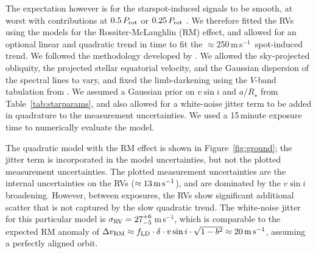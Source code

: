 \documentclass[12pt,modern,twocolumn,tighten]{aastex63}
\newcommand{\ms}{\,m\,s$^{-1}$}
\begin{document}
The expectation however is for the starspot-induced signals to be
smooth, at worst with contributions at $0.5\,P_{\rm rot}$ or
$0.25\,P_{\rm rot}$ \citep{klein_simulated_2020}.  We therefore fitted
the RVs using the \citet{hirano_analytic_2010,hirano_2011} models for
the Rossiter-McLaughlin (RM) effect, and allowed for an optional
linear and quadratic trend in time to fit the $\approx$250\ms\
spot-induced trend.  We followed the methodology developed by
\citet{stefansson_2020}.  We allowed the sky-projected obliquity, the
projected stellar equatorial velocity, and the Gaussian dispersion of
the spectral lines to vary, and fixed the limb-darkening using the
$V$-band tabulation from \citet{claret_gravity_2011}.  We assumed a
Gaussian prior on $v\sin i$ and $a/R_\star$ from
Table~\ref{tab:starparams}, and also allowed for a white-noise jitter
term to be added in quadrature to the measurement uncertainties.  We
used a 15\,minute exposure time to numerically evaluate the model.

The quadratic model with the RM effect is shown in
Figure~\ref{fig:ground}; the jitter term is incorporated in the model
uncertainties, but not the plotted measurement uncertainties.  The
plotted measurement uncertainties are the internal uncertainties on
the RVs ($\approx 13\,{\rm m\,s}^{-1}$), and are dominated by the
$v\sin i$ broadening.  However, between exposures, the RVs show
significant additional scatter that is not captured by the slow
quadratic trend.  The white-noise jitter for this particular model is
$\sigma_{\rm RV} = 27^{+6}_{-5}$\ms, which is comparable to the
expected RM anomaly of $\Delta v_{\rm RM} \approx f_{\rm LD} \cdot
\delta \cdot v\sin i \cdot \sqrt{1-b^2} \approx 20\,{\rm m\,s}^{-1}$,
assuming a perfectly aligned orbit.
\end{document}

